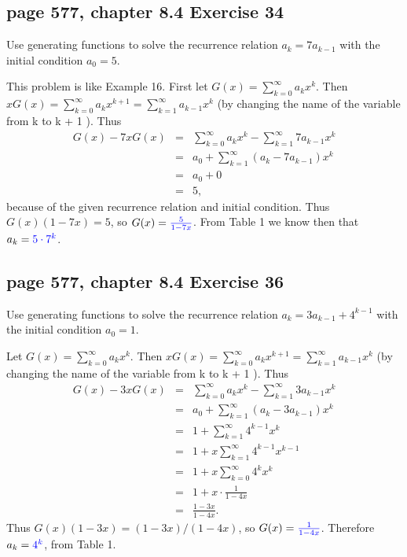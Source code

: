 \documentclass[sigconf]{acmart}
\newcommand{\answer}[2]{%
  \if\relax\detokenize{#2}\relax
    \underline{\mbox{請作答}}%
  \else
    \textcolor{blue}{#2}%
  \fi
}
\begin{document}
\subsection{page 577, chapter 8.4 Exercise 34}
\begin{shaded}
    Use generating functions to solve the recurrence relation $a_k = 7a_{k-1}$ with the initial condition $a_0 = 5$.
\end{shaded}
This problem is like Example 16. First let $G(x) = \sum\limits_{k=0}^\infty a_kx^k$. Then $xG(x) = \sum\limits_{k=0}^\infty a_kx^{k+1} = \sum\limits_{k=1}^\infty a_{k-1}x^k$ (by changing the name of the variable from k to k + 1 ). Thus 
    \begin{eqnarray}
    G(x) - 7xG(x) 
    & = & \sum\limits_{k=0}^\infty a_kx^k - \sum\limits_{k=1}^\infty 7a_{k-1}x^k \\
    ~ & = & a_0 + \sum\limits_{k=1}^\infty (a_k - 7a_{k-1})x^k \\
    ~ & = & a_0 + 0 \\
    ~ & = & 5,
    \end{eqnarray}
because of the given recurrence relation and initial condition. Thus $G(x)(1 - 7x) = 5$, so $G(x) = \answer{8.4.34a}{\frac{5}{1-7x}}$. From Table 1 we know then that $a_k = \answer{8.4.34b}{5 \cdot 7^k}$.



\subsection{page 577, chapter 8.4 Exercise 36}
\begin{shaded}
    Use generating functions to solve the recurrence relation $a_k = 3a_{k-1} + 4^{k-1}$ with the initial condition $a_0 = 1$.
\end{shaded}
Let $G(x) = \sum\limits_{k=0}^\infty a_kx^k$. Then $xG(x) = \sum\limits_{k=0}^\infty a_kx^{k+1} = \sum\limits_{k=1}^\infty a_{k-1}x^k$ (by changing the name of the variable from k to k + 1 ). Thus 
    \begin{eqnarray}
    G(x) - 3xG(x) 
    & = & \sum\limits_{k=0}^\infty a_kx^k - \sum\limits_{k=1}^\infty 3a_{k-1}x^k \\
    ~ & = & a_0 + \sum\limits_{k=1}^\infty (a_k - 3a_{k-1})x^k \\
    ~ & = & 1 + \sum\limits_{k=1}^\infty 4^{k-1}x^k \\
    ~ & = & 1 + x\sum\limits_{k=1}^\infty 4^{k-1}x^{k-1} \\
    ~ & = & 1 + x\sum\limits_{k=0}^\infty 4^kx^k \\
    ~ & = & 1 + x \cdot \frac{1}{1-4x} \\
    ~ & = & \frac{1-3x}{1-4x}.
    \end{eqnarray}
Thus $G(x)(1 - 3x) = (1 - 3x)/(1 - 4x)$, so $G(x) = \answer{8.4.36a}{\frac{1}{1-4x}}$. Therefore $a_k = \answer{8.4.36b}{4^k}$, from Table 1.




\clearpage
\end{document}

